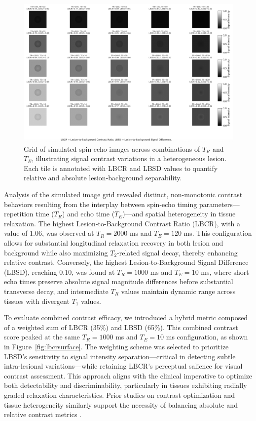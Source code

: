 \documentclass[10pt,a4paper,twoside]{article}
\begin{document}
\begin{figure}[htbp!]
\centering
\includegraphics[width=\textwidth]{figures/lbcrlbsdmatrix.png}
\caption{Grid of simulated spin-echo images across combinations of \( T_R \) and \( T_E \), illustrating signal contrast variations in a heterogeneous lesion. Each tile is annotated with LBCR and LBSD values to quantify relative and absolute lesion-background separability.}
\label{fig:grid}
\end{figure}

Analysis of the simulated image grid revealed distinct, non-monotonic contrast behaviors resulting from the interplay between spin-echo timing parameters—repetition time (\( T_R \)) and echo time (\( T_E \))—and spatial heterogeneity in tissue relaxation. The highest Lesion-to-Background Contrast Ratio (LBCR), with a value of 1.06, was observed at \( T_R = 2000 \) ms and \( T_E = 120 \) ms. This configuration allows for substantial longitudinal relaxation recovery in both lesion and background while also maximizing \( T_2 \)-related signal decay, thereby enhancing relative contrast. Conversely, the highest Lesion-to-Background Signal Difference (LBSD), reaching 0.10, was found at \( T_R = 1000 \) ms and \( T_E = 10 \) ms, where short echo times preserve absolute signal magnitude differences before substantial transverse decay, and intermediate \( T_R \) values maintain dynamic range across tissues with divergent \( T_1 \) values.

To evaluate combined contrast efficacy, we introduced a hybrid metric composed of a weighted sum of LBCR (35\%) and LBSD (65\%). This combined contrast score peaked at the same \( T_R = 1000 \) ms and \( T_E = 10 \) ms configuration, as shown in Figure~\ref{fig:lbcrsurface}. The weighting scheme was selected to prioritize LBSD’s sensitivity to signal intensity separation—critical in detecting subtle intra-lesional variations—while retaining LBCR’s perceptual salience for visual contrast assessment. This approach aligns with the clinical imperative to optimize both detectability and discriminability, particularly in tissues exhibiting radially graded relaxation characteristics. Prior studies on contrast optimization and tissue heterogeneity similarly support the necessity of balancing absolute and relative contrast metrics \cite{tofts2003, does2002, xu2009}.
\end{document}
